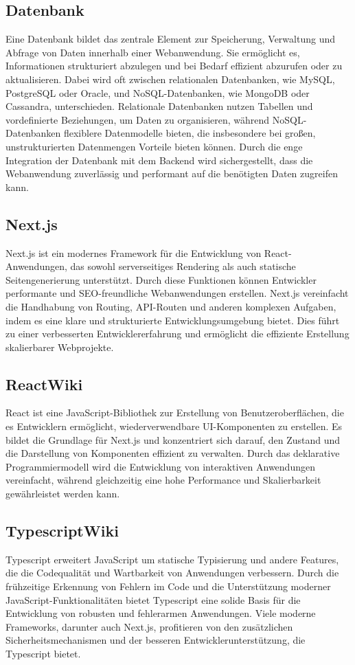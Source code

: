 \begin{inhalt}
\subsection{Datenbank}

Eine Datenbank \cite{DatenBankWiki} bildet das zentrale Element zur Speicherung, Verwaltung und Abfrage von Daten innerhalb einer Webanwendung. Sie ermöglicht es, Informationen strukturiert abzulegen und bei Bedarf effizient abzurufen oder zu aktualisieren. Dabei wird oft zwischen relationalen Datenbanken, wie MySQL, PostgreSQL oder Oracle, und NoSQL-Datenbanken, wie MongoDB oder Cassandra, unterschieden. Relationale Datenbanken nutzen Tabellen und vordefinierte Beziehungen, um Daten zu organisieren, während NoSQL-Datenbanken flexiblere Datenmodelle bieten, die insbesondere bei großen, unstrukturierten Datenmengen Vorteile bieten können. Durch die enge Integration der Datenbank mit dem Backend wird sichergestellt, dass die Webanwendung zuverlässig und performant auf die benötigten Daten zugreifen kann.

\subsection{Next.js}
Next.js \cite{NextJSWiki} ist ein modernes Framework für die Entwicklung von React-Anwendungen, das sowohl serverseitiges Rendering als auch statische Seitengenerierung unterstützt. Durch diese Funktionen können Entwickler performante und SEO-freundliche Webanwendungen erstellen. Next.js vereinfacht die Handhabung von Routing, API-Routen und anderen komplexen Aufgaben, indem es eine klare und strukturierte Entwicklungsumgebung bietet. Dies führt zu einer verbesserten Entwicklererfahrung und ermöglicht die effiziente Erstellung skalierbarer Webprojekte.

\subsection{ReactWiki}
React \cite{ReactWiki} ist eine JavaScript-Bibliothek zur Erstellung von Benutzeroberflächen, die es Entwicklern ermöglicht, wiederverwendbare UI-Komponenten zu erstellen. Es bildet die Grundlage für Next.js und konzentriert sich darauf, den Zustand und die Darstellung von Komponenten effizient zu verwalten. Durch das deklarative Programmiermodell wird die Entwicklung von interaktiven Anwendungen vereinfacht, während gleichzeitig eine hohe Performance und Skalierbarkeit gewährleistet werden kann.

\subsection{TypescriptWiki}
Typescript \cite{TypescriptWiki} erweitert JavaScript um statische Typisierung und andere Features, die die Codequalität und Wartbarkeit von Anwendungen verbessern. Durch die frühzeitige Erkennung von Fehlern im Code und die Unterstützung moderner JavaScript-Funktionalitäten bietet Typescript eine solide Basis für die Entwicklung von robusten und fehlerarmen Anwendungen. Viele moderne Frameworks, darunter auch Next.js, profitieren von den zusätzlichen Sicherheitsmechanismen und der besseren Entwicklerunterstützung, die Typescript bietet.


\end{inhalt}
